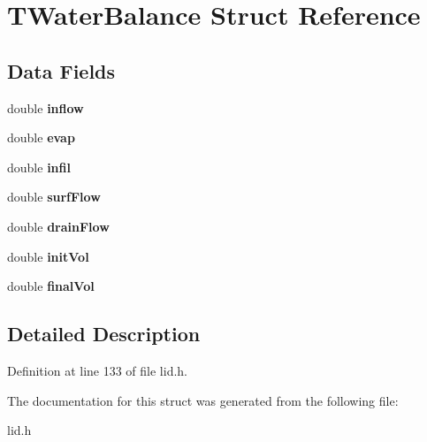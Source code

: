 \hypertarget{struct_t_water_balance}{}\section{T\+Water\+Balance Struct Reference}
\label{struct_t_water_balance}
\subsection*{Data Fields}
\begin{DoxyCompactItemize}
\item 
\mbox{\label{struct_t_water_balance_a1d63a7ad270bb2f91fd16ce60191dfa6}} 
double {\bfseries inflow}
\item 
\mbox{\label{struct_t_water_balance_a90a48831849f8794a1ab4988b4755e23}} 
double {\bfseries evap}
\item 
\mbox{\label{struct_t_water_balance_a870be47f33955d02d624bc9de06adad0}} 
double {\bfseries infil}
\item 
\mbox{\label{struct_t_water_balance_ac7c4db03c8cf4b2443dcba0e0284d754}} 
double {\bfseries surf\+Flow}
\item 
\mbox{\label{struct_t_water_balance_abd9fc47f6abe97caa7aeda72887bda11}} 
double {\bfseries drain\+Flow}
\item 
\mbox{\label{struct_t_water_balance_a90b727966ced13ac3a031a4c01145162}} 
double {\bfseries init\+Vol}
\item 
\mbox{\label{struct_t_water_balance_a6e2b7505a556bcc6ac826a3313ac50b8}} 
double {\bfseries final\+Vol}
\end{DoxyCompactItemize}


\subsection{Detailed Description}


Definition at line 133 of file lid.\+h.



The documentation for this struct was generated from the following file\+:\begin{DoxyCompactItemize}
\item 
lid.\+h\end{DoxyCompactItemize}
